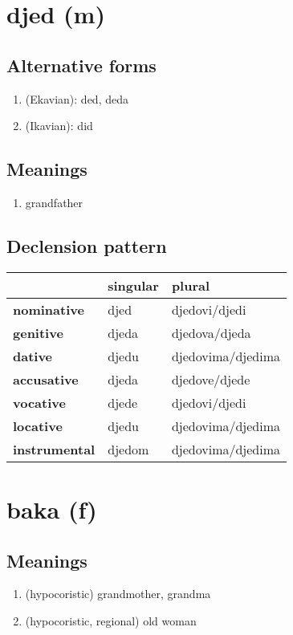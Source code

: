 \filbreak
\section{djed (m)}
\subsection*{Alternative forms}
\begin{enumerate}
\item (Ekavian): ded, deda
\item (Ikavian): did
\end{enumerate}
\subsection*{Meanings}
\begin{enumerate}
\item grandfather
\end{enumerate}
\subsection*{Declension pattern}
\begin{tabularx}{\linewidth}{Xll}
\toprule
{} & singular &             plural \\
\midrule
\textbf{nominative  } &     djed &      djedovi/djedi \\
\textbf{genitive    } &    djeda &      djedova/djeda \\
\textbf{dative      } &    djedu &  djedovima/djedima \\
\textbf{accusative  } &    djeda &      djedove/djede \\
\textbf{vocative    } &    djede &      djedovi/djedi \\
\textbf{locative    } &    djedu &  djedovima/djedima \\
\textbf{instrumental} &   djedom &  djedovima/djedima \\
\bottomrule
\end{tabularx}

\filbreak
\section{baka (f)}
\subsection*{Meanings}
\begin{enumerate}
\item (hypocoristic) grandmother, grandma
\item (hypocoristic, regional) old woman
\end{enumerate}

